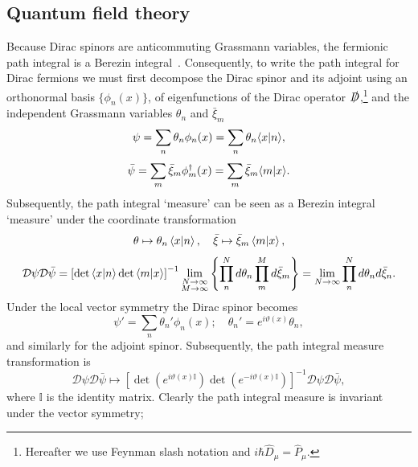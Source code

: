 \documentclass[11pt, a4paper]{article}
\begin{document}
\subsection{Quantum field theory}
Because Dirac spinors are anticommuting Grassmann variables, the fermionic path integral
is a Berezin integral~\cite{BerezinBook}.
Consequently, to write the path integral for Dirac fermions we must first
decompose the Dirac spinor and its adjoint using an orthonormal basis $\{ \phi_n(x) \}$, of
eigenfunctions of the Dirac operator
$\slashed{D}$,\footnote{Hereafter we use Feynman slash notation
and $i\hbar \widehat{D}_\mu = \widehat{P}_\mu$.}
and the independent Grassmann variables
$\theta_n$ and $\bar{\xi}_m$
\begin{equation}
  \psi = \sum_n{\theta_n\phi_n(x)} = \sum_n{\theta_n\!\braket{x|n}},
\end{equation}
\begin{equation}
  \bar{\psi} = \sum_m{\bar{\xi}_m\phi^{\dagger}_m(x)} = \sum_m{\bar{\xi}_m\!\braket{m|x}}.
  \end{equation}
Subsequently, the path integral `measure' can be seen as a
Berezin integral `measure' under the coordinate transformation
\begin{equation}
  \theta \mapsto \theta_n\braket{x|n},\quad
  \bar{\xi} \mapsto \bar{\xi}_m\braket{m|x},
\end{equation}
\begin{equation}
  \mathcal{D}\psi\mathcal{D}\bar{\psi}
  = {\left[\det{\braket{x|n}}\det{\braket{m|x}}\right]}^{-1}
  \lim_{\substack{N \rightarrow \infty \\
  M \rightarrow \infty}}{\left\{ \prod_n^N{d\theta_n}\prod_m^M{d\bar{\xi}_m} \right\}}
  = \lim_{N \rightarrow \infty}{\prod_n^N{d\theta_n d\bar{\xi}_n}}.
\end{equation}
Under the local vector symmetry the Dirac spinor becomes
\begin{equation}
  \psi' = \sum_n{\theta_n'\phi_n(x)} ;\quad \theta_n' = e^{i\vartheta(x)}\theta_n,
\end{equation}
and similarly for the adjoint spinor. Subsequently, the path integral measure transformation is
\begin{equation}
  \mathcal{D}\psi\mathcal{D}\bar{\psi} \mapsto
  {\left[\det{\left(e^{i\vartheta(x)\mathbb{I}}\right)}
  \det{\left(e^{-i\vartheta(x)\mathbb{I}}\right)} \right]}^{-1}
  \mathcal{D}\psi\mathcal{D}\bar{\psi},
\end{equation}
where $\mathbb{I}$ is the identity matrix.
Clearly the path integral measure is invariant under the vector symmetry;
\end{document}
